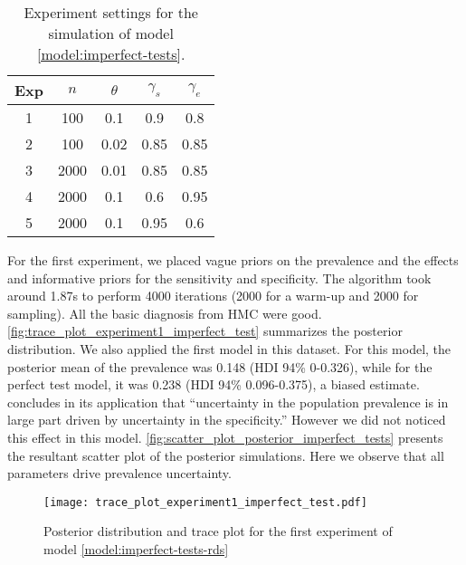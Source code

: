 \begin{table}[!ht]
  \centering
  \caption{\label{table:experiments-imperfect-test}Experiment settings for the
  simulation of model \eqref{model:imperfect-tests}.}
  \begin{tabular}{ccccc}
  \hline
  Exp & $n$ & $\theta$ & $\gamma_s$ & $\gamma_e$ \\ \hline
  \multicolumn{1}{c}{1} & 100 & 0.1 & 0.9 & 0.8 \\
  \multicolumn{1}{c}{2} & 100 & 0.02 & 0.85 & 0.85 \\
  \multicolumn{1}{c}{3} & 2000 & 0.01 & 0.85 & 0.85 \\
  \multicolumn{1}{c}{4} & 2000 & 0.1 & 0.6 & 0.95 \\
  \multicolumn{1}{c}{5} & 2000 & 0.1 & 0.95 & 0.6 \\ \hline
  \end{tabular}
\end{table}

For the first experiment, we placed vague priors on the prevalence and the
effects and informative priors for the sensitivity and specificity. The
algorithm took around 1.87s to perform 4000 iterations  (2000 for a warm-up
and 2000 for sampling). All the basic diagnosis from HMC were good. 
\autoref{fig:trace_plot_experiment1_imperfect_test} summarizes the posterior
distribution. We also applied the first model in this dataset. For this model,
the posterior mean of the prevalence was 0.148 (HDI 94\% 0-0.326), while for
the perfect test model, it was 0.238 (HDI 94\% 0.096-0.375), a biased
estimate. \textcite[p. 1271]{gelman2020bayesian} concludes in its application
that ``uncertainty in the population prevalence is in large part driven by
uncertainty in the specificity.'' However we did not noticed this effect in
this model. \autoref{fig:scatter_plot_posterior_imperfect_tests} presents the
resultant scatter plot of the posterior simulations. Here we observe that all
parameters drive prevalence uncertainty. 

\begin{figure}[ht]
  \centering
  \caption{\label{fig:trace_plot_experiment1_imperfect_test}Posterior distribution
  and trace plot for the first experiment of model
  \eqref{model:imperfect-tests-rds}}
  \texttt{[image: trace\_plot\_experiment1\_imperfect\_test.pdf]}
\end{figure}

